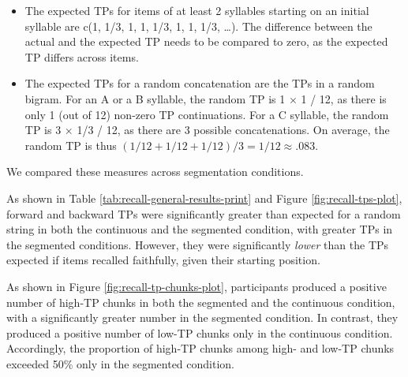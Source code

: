 \documentclass[]{article}
\providecommand{\tightlist}{%
  \setlength{\itemsep}{0pt}\setlength{\parskip}{0pt}}
\begin{document}
\begin{itemize}
\tightlist
\item
  The expected TPs for items of at least 2 syllables starting on an
  initial syllable are c(1, 1/3, 1, 1, 1/3, 1, 1, 1/3, \ldots{}). The
  difference between the actual and the expected TP needs to be compared
  to zero, as the expected TP differs across items.
\item
  The expected TPs for a random concatenation are the TPs in a random
  bigram. For an A or a B syllable, the random TP is 1 \(\times\) 1 /
  12, as there is only 1 (out of 12) non-zero TP continuations. For a C
  syllable, the random TP is 3 \(\times\) 1/3 / 12, as there are 3
  possible concatenations. On average, the random TP is thus
  \((1/12 + 1/12 + 1/12)/ 3 = 1/12 \approx .083\).
\end{itemize}

We compared these measures across segmentation conditions.

As shown in Table \ref{tab:recall-general-results-print} and Figure
\ref{fig:recall-tps-plot}, forward and backward TPs were significantly
greater than expected for a random string in both the continuous and the
segmented condition, with greater TPs in the segmented conditions.
However, they were significantly \emph{lower} than the TPs expected if
items recalled faithfully, given their starting position.

As shown in Figure \ref{fig:recall-tp-chunks-plot}, participants
produced a positive number of high-TP chunks in both the segmented and
the continuous condition, with a significantly greater number in the
segmented condition. In contrast, they produced a positive number of
low-TP chunks only in the continuous condition. Accordingly, the
proportion of high-TP chunks among high- and low-TP chunks exceeded 50\%
only in the segmented condition.
\end{document}
